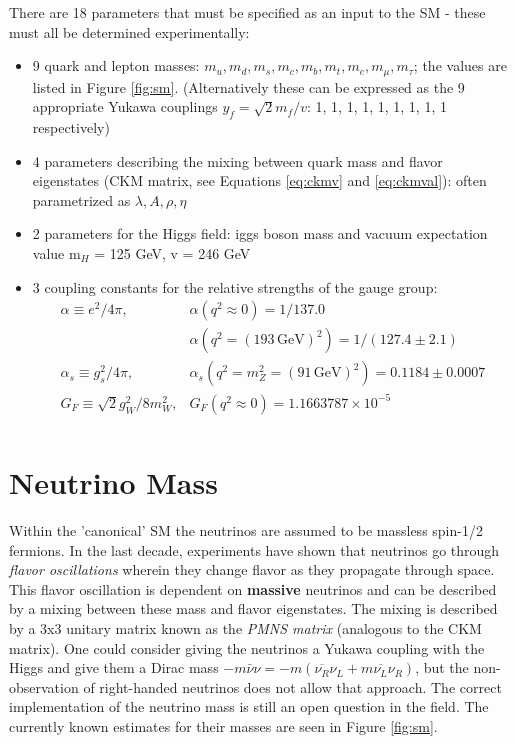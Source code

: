 There are 18 parameters that must be specified as an input to the SM - these must all be determined experimentally:

\begin{itemize}
\item 9 quark and lepton masses: $m_{u}, m_{d}, m_{s}, m_{c}, m_{b}, m_{t}, m_{e}, m_{\mu}, m_{\tau}$; the values are listed in Figure \ref{fig:sm}. (Alternatively these can be expressed as the 9 appropriate Yukawa couplings $y_{f}=\sqrt{2}m_{f} / v$: 1, 1, 1, 1, 1, 1, 1, 1, 1 respectively)
\item 4 parameters describing the mixing between quark mass and flavor eigenstates (CKM matrix, see Equations \ref{eq:ckmv} and \ref{eq:ckmval}): often parametrized as $\lambda, A, \rho, \eta$
\item 2 parameters for the Higgs field: iggs boson mass and vacuum expectation value m$_{H}$ = 125 GeV, v = 246 GeV 
\item 3 coupling constants for the relative strengths of the gauge group:
\begin{equation*}
\begin{array}{ll}
\alpha \equiv e^{2} / 4 \pi, & \alpha(q^{2} \approx 0) = 1 / 137.0 \\
 & \alpha(q^{2} = (193\,\mathrm{GeV})^{2}) = 1 / (127.4\pm 2.1)\\
\alpha_{s} \equiv g_{s}^{2} / 4 \pi,  & \alpha_{s}(q^{2}=m_{Z}^{2} = (91\,\mathrm{GeV})^{2})= 0.1184 \pm 0.0007\\
G_{F} \equiv \sqrt{2} g^{2}_{W} / 8 m_{W}^{2}, & G_{F} (q^{2}\approx0) = 1.1663787\times10^{-5} \\

\end{array}
\end{equation*}
\end{itemize}

\section{Neutrino Mass}

Within the 'canonical' SM the neutrinos are assumed to be massless spin-1/2 fermions. In the last decade, experiments have shown that neutrinos go through \textit{flavor oscillations} wherein they change flavor as they propagate through space. This flavor oscillation is dependent on \textbf{massive} neutrinos and can be described by a mixing between these mass and flavor eigenstates. The mixing is described by a 3x3 unitary matrix known as the \textit{PMNS matrix} (analogous to the CKM matrix). One could consider giving the neutrinos a Yukawa coupling with the Higgs and give them a Dirac mass $-m\bar{\nu}\nu = -m(\overline{\nu_{R}}\nu_{L} + m\overline{\nu_{L}}\nu_{R})$, but the non-observation of right-handed neutrinos does not allow that approach. The correct implementation of the neutrino mass is still an open question in the field. The currently known estimates for their masses are seen in Figure \ref{fig:sm}.

